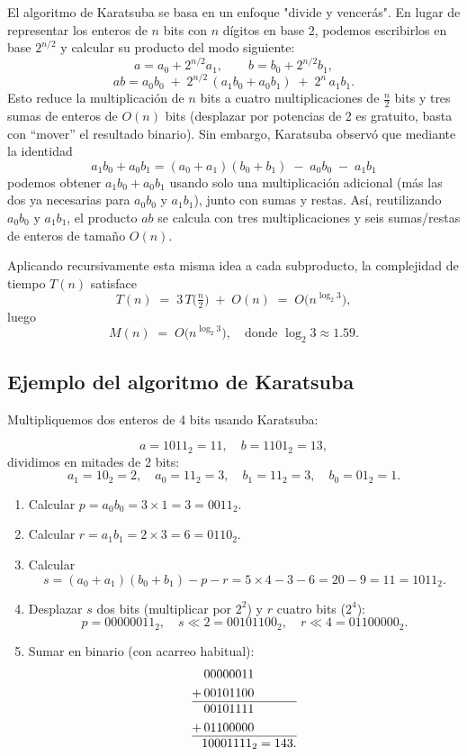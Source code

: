 El algoritmo de Karatsuba se basa en un enfoque "divide y vencerás". En lugar de representar los enteros de \(n\) bits con \(n\) dígitos en base 2, podemos escribirlos en base \(2^{n/2}\) y calcular su producto del modo siguiente:
\[
  a = a_0 + 2^{n/2}a_1,\qquad
  b = b_0 + 2^{n/2}b_1,
\]
\[
  ab = a_0b_0 \;+\; 2^{n/2}\,(a_1b_0 + a_0b_1)\;+\;2^n\,a_1b_1.
\]
Esto reduce la multiplicación de \(n\) bits a cuatro multiplicaciones de \(\tfrac n2\) bits y tres sumas de enteros de \(O(n)\) bits (desplazar por potencias de 2 es gratuito, basta con “mover” el resultado binario). Sin embargo, Karatsuba observó que mediante la identidad
\[
  a_1b_0 + a_0b_1
  = (a_0 + a_1)(b_0 + b_1) \;-\; a_0b_0 \;-\; a_1b_1
\]
podemos obtener \(a_1b_0 + a_0b_1\) usando solo una multiplicación adicional (más las dos ya necesarias para \(a_0b_0\) y \(a_1b_1\)), junto con sumas y restas. Así, reutilizando \(a_0b_0\) y \(a_1b_1\), el producto \(ab\) se calcula con tres multiplicaciones y seis sumas/restas de enteros de tamaño \(O(n)\). 

Aplicando recursivamente esta misma idea a cada subproducto, la complejidad de tiempo \(T(n)\) satisface
\[
  T(n) \;=\; 3\,T\bigl(\tfrac n2\bigr) \;+\; O(n)
  \;=\; O\bigl(n^{\log_2 3}\bigr),
\]
luego
\[
  M(n)\;=\;O\bigl(n^{\log_2 3}\bigr),
  \quad\text{donde }\log_2 3\approx1.59.
\]

\subsection*{Ejemplo del algoritmo de Karatsuba}

Multipliquemos dos enteros de 4 bits usando Karatsuba:

\[
a = 1011_2 = 11,\quad b = 1101_2 = 13,
\]
dividimos en mitades de 2 bits:
\[
a_1 = 10_2 = 2,\quad a_0 = 11_2 = 3,\quad
b_1 = 11_2 = 3,\quad b_0 = 01_2 = 1.
\]
\begin{enumerate}
  \item Calcular \(p = a_0 b_0 = 3 \times 1 = 3 = 0011_2\).
  \item Calcular \(r = a_1 b_1 = 2 \times 3 = 6 = 0110_2\).
  \item Calcular 
  \[
    s = (a_0 + a_1)(b_0 + b_1) - p - r 
      = 5 \times 4 - 3 - 6 
      = 20 - 9 
      = 11 
      = 1011_2.
  \]
  \item Desplazar \(s\) dos bits (multiplicar por \(2^2\)) y \(r\) cuatro bits (\(2^4\)):
  \[
    p           = 00000011_2,\quad
    s \ll 2     = 00101100_2,\quad
    r \ll 4     = 01100000_2.
  \]
  \item Sumar en binario (con acarreo habitual):
  \[
    \begin{aligned}
      &\phantom{\,}00000011\\
      +&\phantom{\,}00101100\\\hline
      &\phantom{\,}00101111\\
      +&\phantom{\,}01100000\\\hline
      &           10001111_2 = 143.
    \end{aligned}
  \]
\end{enumerate}

